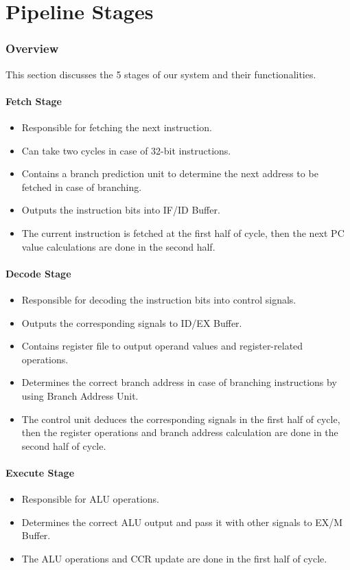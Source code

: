 \documentclass[12pt]{report}
\begin{document}
\part{Pipeline Stages}

\section{Overview}
This section discusses the 5 stages of our system and their functionalities.

\subsection{Fetch Stage}
\begin{itemize}
    \item Responsible for fetching the next instruction.
    \item Can take two cycles in case of 32-bit instructions.
    \item Contains a branch prediction unit to determine the next address to be fetched in case of branching.
    \item Outputs the instruction bits into IF/ID Buffer.
    \item The current instruction is fetched at the first half of cycle, then the next PC value calculations are done in the second half.
\end{itemize}

\subsection{Decode Stage}
\begin{itemize}
    \item Responsible for decoding the instruction bits into control signals.
    \item Outputs the corresponding signals to ID/EX Buffer.
    \item Contains register file to output operand values and register-related operations.
    \item Determines the correct branch address in case of branching instructions by using Branch Address Unit.
    \item The control unit deduces the corresponding signals in the first half of cycle, then the register operations and branch address calculation are done in the second half of cycle.
\end{itemize}

\subsection{Execute Stage}
\begin{itemize}
    \item Responsible for ALU operations.
    \item Determines the correct ALU output and pass it with other signals to EX/M Buffer.
    \item The ALU operations and CCR update are done in the first half of cycle.
\end{itemize}
\end{document}
